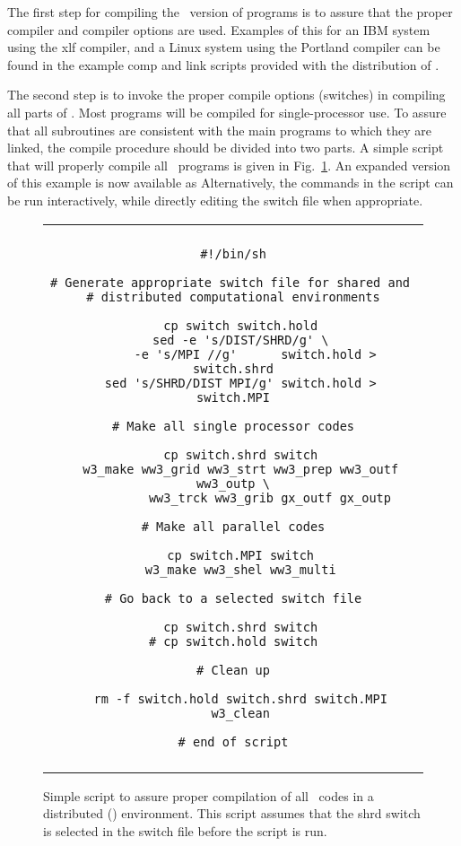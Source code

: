The first step for compiling the \mpi\ version of programs is to assure that
the proper compiler and compiler options are used. Examples of this for an IBM
system using the xlf compiler, and a Linux system using the Portland compiler
can be found in the example {\file comp} and {\file link} scripts provided
with the distribution of \ws.

The second step is to invoke the proper compile options (switches) in
compiling all parts of \ws. Most programs will be compiled for
single-processor use. To assure that all subroutines are consistent with the
main programs to which they are linked, the compile procedure should be
divided into two parts.  A simple script that will properly compile all \ws\
programs is given in Fig.~\ref{fig:make_MPI}.  An expanded version of this
example is now available as \command{make\_MPI} Alternatively, the commands
in the script can be run interactively, while directly editing the {\file
  switch} file when appropriate.

\begin{figure}
\begin{center} \begin{tabular}{|c|} \hline \\
\begin{minipage}{5in} 
\begin{verbatim}
#!/bin/sh

# Generate appropriate switch file for shared and 
# distributed computational environments

  cp switch switch.hold
  sed -e 's/DIST/SHRD/g' \
      -e 's/MPI //g'      switch.hold > switch.shrd
  sed 's/SHRD/DIST MPI/g' switch.hold > switch.MPI

# Make all single processor codes

  cp switch.shrd switch
  w3_make ww3_grid ww3_strt ww3_prep ww3_outf ww3_outp \
          ww3_trck ww3_grib gx_outf gx_outp

# Make all parallel codes

  cp switch.MPI switch
  w3_make ww3_shel ww3_multi

# Go back to a selected switch file

  cp switch.shrd switch
# cp switch.hold switch

# Clean up

  rm -f switch.hold switch.shrd switch.MPI
  w3_clean

# end of script
\end{verbatim}
\end{minipage} \\ \\ \hline
\end{tabular} \end{center}

\caption{Simple script to assure proper compilation of all \ws\ codes in a
   distributed (\mpi) environment. This script assumes that the {\F shrd}
   switch is selected in the {\file switch} file before the script is run.}
   \label{fig:make_MPI}
\end{figure}

